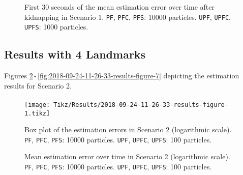 \begin{figure}
	\centering
	\setlength{} 	
	\setlength\figurewidth{0.9\textheight}		
	\caption[First 30 seconds of the mean estimation error over time after kidnapping in Scenario 1. \texttt{PF}, \texttt{PFC}, \texttt{PFS}: 10000 particles. \texttt{UPF}, \texttt{UPFC}, \texttt{UPFS}: 1000 particles.]{First 30 seconds of the mean estimation error over time after kidnapping in Scenario 1. \texttt{PF}, \texttt{PFC}, \texttt{PFS}: 10000 particles. \texttt{UPF}, \texttt{UPFC}, \texttt{UPFS}: 1000 particles.}	
	\label{fig:2018-10-04-15-13-55-results-figure-8}			
\end{figure}


\subsection{Results with 4 Landmarks}

Figures \ref{fig:2018-09-24-11-26-33-results-figure-1}\,-\,\ref{fig:2018-09-24-11-26-33-results-figure-7} depicting the estimation results for Scenario 2.

\paragraph{}


\begin{figure}[h!]
	\centering
	\setlength\figureheight{0.8\textheight} 	
	\setlength{}		
	\texttt{[image: Tikz/Results/2018-09-24-11-26-33-results-figure-1.tikz]}			
	\caption[Box plot of the estimation errors in Scenario 2. \texttt{PF}, \texttt{PFC}, \texttt{PFS}: 10000 particles. \texttt{UPF}, \texttt{UPFC}, \texttt{UPFS}: 100 particles.]{Box plot of the estimation errors in Scenario 2 (logarithmic scale). \texttt{PF}, \texttt{PFC}, \texttt{PFS}: 10000 particles. \texttt{UPF}, \texttt{UPFC}, \texttt{UPFS}: 100 particles.}
	\label{fig:2018-09-24-11-26-33-results-figure-1}			
\end{figure}

\begin{figure}
	\centering
	\setlength{} 	
	\setlength\figurewidth{0.9\textheight}		
	\caption[Mean estimation error over time in Scenario 2. \texttt{PF}, \texttt{PFC}, \texttt{PFS}: 10000 particles. \texttt{UPF}, \texttt{UPFC}, \texttt{UPFS}: 100 particles.]{Mean estimation error over time in Scenario 2 (logarithmic scale). \texttt{PF}, \texttt{PFC}, \texttt{PFS}: 10000 particles. \texttt{UPF}, \texttt{UPFC}, \texttt{UPFS}: 100 particles.}
	\label{fig:2018-09-24-11-26-33-results-figure-5}			
\end{figure}

